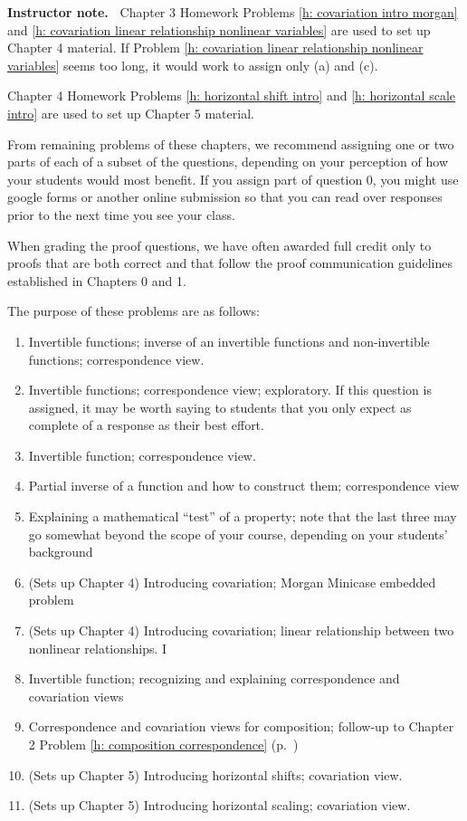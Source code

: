 \documentclass[11pt]{article}
\newenvironment{bignote}[1][Instructor note]%
	{\begin{mdframed}\raggedright{\bf #1.~}}
	{\end{mdframed}}
\theoremstyle{definition}
\begin{document}
\begin{bignote}
Chapter 3 Homework Problems \ref{h: covariation intro morgan} and \ref{h: covariation linear relationship nonlinear variables} are used to set up Chapter 4 material. If Problem \ref{h: covariation linear relationship nonlinear variables} seems too long, it would work to assign only (a) and (c).

Chapter 4 Homework Problems \ref{h: horizontal shift intro} and \ref{h: horizontal scale intro} are used to set up Chapter 5 material.

From remaining problems of these chapters, we recommend assigning one or two parts of each of a subset of the questions, depending on your perception of how your students would most benefit. If you assign part of question 0, you might use google forms or another online submission so that you can read over responses prior to the next time you see your class. 

When grading the proof questions, we have often awarded full credit only to proofs that are both correct and that follow the proof communication guidelines established in Chapters 0 and 1. 

The purpose of these problems are as follows:
	\begin{enumerate}
	\item  Invertible functions; inverse of an invertible functions and non-invertible functions; correspondence view.
	\item Invertible functions; correspondence view; exploratory. If this question is assigned, it may be worth saying to students that you only expect as complete of a response as their best effort.
	\item Invertible function; correspondence view.
	\item Partial inverse of a function and how to construct them; correspondence view
	\item Explaining a mathematical ``test'' of a property; note that the last three may go somewhat beyond the scope of your course, depending on your students' background
	\item (Sets up Chapter 4) Introducing covariation; Morgan Minicase embedded problem
	\item (Sets up Chapter 4) Introducing covariation; linear relationship between two nonlinear relationships. I
	\item Invertible function; recognizing and explaining correspondence and covariation views
	\item Correspondence and covariation views for composition; follow-up to Chapter 2 Problem \ref{h: composition correspondence} (p.~\pageref{h: composition correspondence})
	\item (Sets up Chapter 5) Introducing horizontal shifts; covariation view.
	\item (Sets up Chapter 5) Introducing horizontal scaling; covariation view.
	\end{enumerate}
	

\end{bignote}
\end{document}
